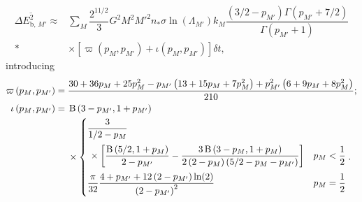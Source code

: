 \begin{align}
\overline{\Delta E^2_{\mathrm{b},\,M'}} \approx {} & \sum_M\dfrac{2^{11/2}}{3}G^2M^2{M'}^2n_\ast\sigma\ln\left(\Lambda_{M'}\right) k_M \dfrac{(3/2 - p_{M'})\Gamma(p_{M'} + 7/2)}{\Gamma(p_{M'} + 1)} \nonumber \\*
 {} & \times \left[ \varpi\left(p_M,p_{M'}\right) + \iota \left(p_M,p_{M'}\right) \right] \delta t,
\end{align}
introducing
\begin{align}
\varpi\left(p_M,p_{M'}\right) = {} & \dfrac{30 + 36p_M + 25p_M^2 - p_{M'}\left(13 + 15p_M + 7 p_M^2\right) + p_{M'}^2\left(6 + 9p_M + 8p_M^2\right)}{210}; \\
\iota\left(p_M,p_{M'}\right) = {} & \Beta\left(3-p_{M'},1+p_{M'}\right) \nonumber \\*
 {} & {} \times \begin{cases} \dfrac{3}{1/2 - p_M} \vspace{2mm} \\
  \, {} \times \left[\dfrac{\Beta\left(5/2,1+p_M\right)}{2-p_{M'}} - \dfrac{3\Beta\left(3-p_M,1+p_M\right)}{2\left(2-p_M\right)\left(5/2 - p_M - p_{M'}\right)}\right] \vspace{2mm} & p_M < \recip{2} \\
\dfrac{\pi}{32}\dfrac{4 + p_{M'} + 12 \left(2 - p_{M'}\right) \ln(2)}{\left(2-p_{M'}\right)^2} & p_M = \recip{2} \end{cases}.
\end{align}

